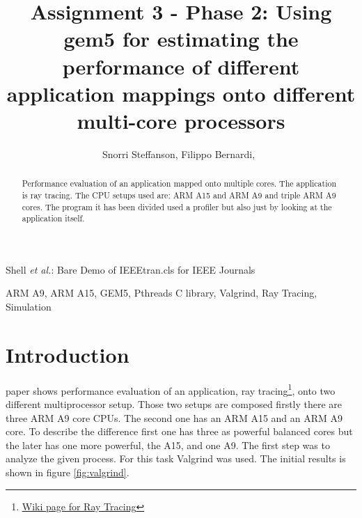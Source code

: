 \documentclass[journal]{IEEEtran}
\begin{document}
\title{Assignment 3 - Phase 2: Using gem5 for estimating the performance of different application mappings onto different multi-core processors
}

\author{Snorri Steffanson, Filippo Bernardi,~
}



%
{Shell \MakeLowercase{\textit{et al.}}: Bare Demo of IEEEtran.cls for IEEE Journals}


\maketitle

\begin{abstract}
Performance evaluation of an application mapped onto multiple cores. The application is ray tracing. The CPU setups used are: ARM A15 and ARM A9 and triple ARM A9 cores. The program it has been divided used a profiler but also just by looking at the application itself. 
\end{abstract}

\begin{IEEEkeywords}
ARM A9, ARM A15, GEM5, Pthreads C library, Valgrind, Ray Tracing, Simulation
\end{IEEEkeywords}


\IEEEpeerreviewmaketitle

\section{Introduction}

 paper shows performance evaluation of an application, ray tracing\footnote{\hyperref{https://en.wikipedia.org/wiki/Ray_tracing_(graphics)}{}{Ray Tracing}{Wiki page for Ray Tracing}}, onto two different multiprocessor setup. Those two setups are composed firstly there are three ARM A9 core CPUs. The second one has an ARM A15 and an ARM A9 core.
To describe the difference first one has three as powerful balanced cores but the later has one more powerful, the A15, and one A9.
The first step was to analyze the given process. For this task Valgrind was used.
The initial results is shown in figure \ref{fig:valgrind}.
\end{document}
